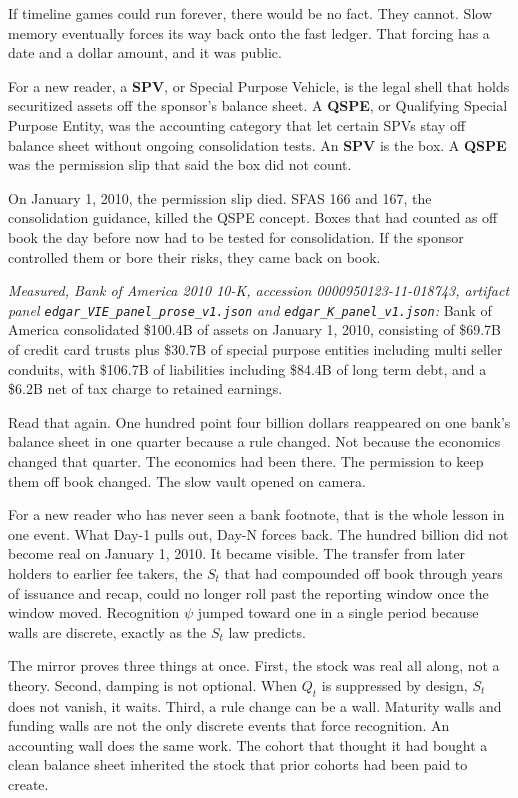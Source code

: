If timeline games could run forever, there would be no fact. They cannot. Slow memory eventually forces its way back onto the fast ledger. That forcing has a date and a dollar amount, and it was public.

For a new reader, a \textbf{SPV}, or Special Purpose Vehicle, is the legal shell that holds securitized assets off the sponsor's balance sheet. A \textbf{QSPE}, or Qualifying Special Purpose Entity, was the accounting category that let certain SPVs stay off balance sheet without ongoing consolidation tests. An \textbf{SPV} is the box. A \textbf{QSPE} was the permission slip that said the box did not count.

On January 1, 2010, the permission slip died. SFAS 166 and 167, the consolidation guidance, killed the QSPE concept. Boxes that had counted as off book the day before now had to be tested for consolidation. If the sponsor controlled them or bore their risks, they came back on book.

\textit{Measured, Bank of America 2010 10-K, accession 0000950123-11-018743, artifact panel \texttt{edgar\_VIE\_panel\_prose\_v1.json} and \texttt{edgar\_K\_panel\_v1.json}:} Bank of America consolidated \$100.4B of assets on January 1, 2010, consisting of \$69.7B of credit card trusts plus \$30.7B of special purpose entities including multi seller conduits, with \$106.7B of liabilities including \$84.4B of long term debt, and a \$6.2B net of tax charge to retained earnings.

Read that again. One hundred point four billion dollars reappeared on one bank's balance sheet in one quarter because a rule changed. Not because the economics changed that quarter. The economics had been there. The permission to keep them off book changed. The slow vault opened on camera.

For a new reader who has never seen a bank footnote, that is the whole lesson in one event. What Day-1 pulls out, Day-N forces back. The hundred billion did not become real on January 1, 2010. It became visible. The transfer from later holders to earlier fee takers, the $S_t$ that had compounded off book through years of issuance and recap, could no longer roll past the reporting window once the window moved. Recognition $\psi$ jumped toward one in a single period because walls are discrete, exactly as the $S_t$ law predicts.

The mirror proves three things at once. First, the stock was real all along, not a theory. Second, damping is not optional. When $Q_t$ is suppressed by design, $S_t$ does not vanish, it waits. Third, a rule change can be a wall. Maturity walls and funding walls are not the only discrete events that force recognition. An accounting wall does the same work. The cohort that thought it had bought a clean balance sheet inherited the stock that prior cohorts had been paid to create.

